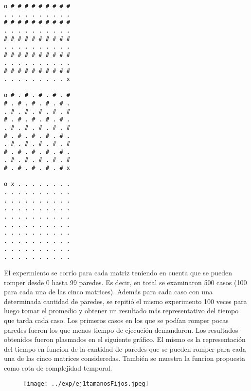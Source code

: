 \begin{itemize}
\begin{codesnippet}
\begin{verbatim}
o # # # # # # # # #
. . . . . . . . . .
# # # # # # # # # #
. . . . . . . . . .
# # # # # # # # # #
. . . . . . . . . .
# # # # # # # # # #
. . . . . . . . . .
# # # # # # # # # #
. . . . . . . . . x

o # . # . # . # . #
# . # . # . # . # .
. # . # . # . # . #
# . # . # . # . # .
. # . # . # . # . #
# . # . # . # . # .
. # . # . # . # . #
# . # . # . # . # .
. # . # . # . # . #
# . # . # . # . # x

o x . . . . . . . .
. . . . . . . . . .
. . . . . . . . . .
. . . . . . . . . .
. . . . . . . . . .
. . . . . . . . . .
. . . . . . . . . .
. . . . . . . . . .
. . . . . . . . . .
. . . . . . . . . .

\end{verbatim}
            \end{codesnippet}

  El expermiento se corrío para cada matriz teniendo en cuenta que se pueden romper desde 0 hasta 99 paredes. Es decir, en total se examinaron 500 casos (100 para cada una de las cinco matrices). Además para cada caso con una determinada cantidad de paredes, se repitió el mismo experimento 100 veces para luego tomar el promedio y obtener un resultado más representativo del tiempo que tarda cada caso. Los primeros casos en los que se podían romper pocas paredes fueron los que menos tiempo de ejecución demandaron.
  Los resultados obtenidos fueron plasmados en el siguiente gráfico. El mismo es la representación del tiempo en funcion de la cantidad de paredes que se pueden romper para cada una de las cinco matrices consideredas. También se muestra la funcion propuesta como cota de complejidad temporal.

  \begin{figure}[H]
      \begin{center}
        \texttt{[image: ../exp/ej1tamanosFijos.jpeg]}
        \caption{}
      \end{center}
  \end{figure}


\end{itemize}
